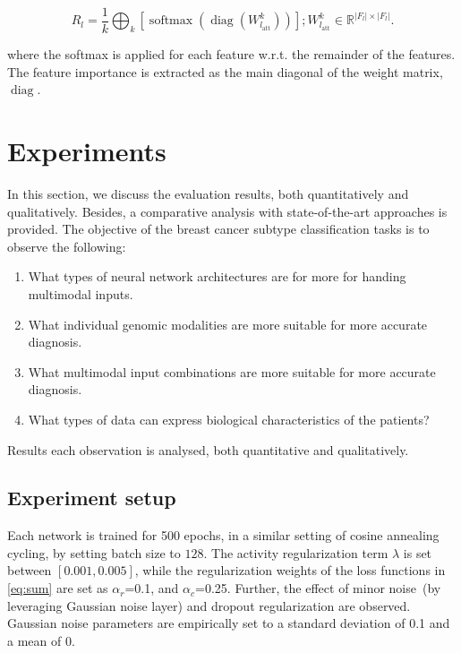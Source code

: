 \begin{equation}
    R_{l}=\frac{1}{k} \bigoplus_{k}\left[\operatorname{softmax}\left(\operatorname{diag}\left(W_{l_{\mathrm{att}}}^{k}\right)\right)\right] ; W_{l_{\mathrm{att}}}^{k} \in \mathbb{R}^{|F_l| \times|F_l|}.
\end{equation}

\hspace*{3.5mm} where the softmax is applied for each feature w.r.t. the remainder of the features. The feature importance is extracted as the main diagonal of the weight matrix, $\operatorname{diag}$. 


\section{Experiments}\label{chapter_5:results} 
In this section, we discuss the evaluation results, both quantitatively and qualitatively. Besides, a comparative analysis with state-of-the-art approaches is provided. The objective of the breast cancer subtype classification tasks is to observe the following:

\begin{enumerate}[noitemsep]
    \item What types of neural network architectures are for more for handing multimodal inputs. 
    \item What individual genomic modalities are more suitable for more accurate diagnosis. 
    \item What multimodal input combinations are more suitable for more accurate diagnosis.
    \item What types of data can express biological characteristics of the patients? 
\end{enumerate}

\hspace*{3.5mm} Results each observation is analysed, both quantitative and qualitatively. 

\subsection{Experiment setup}
Each network is trained for 500 epochs, in a similar setting of cosine annealing cycling, by setting batch size to $128$. The activity regularization term $\lambda$ is set between $[0.001, 0.005]$, while the regularization weights of the loss functions in \cref{eq:sum} are set as  $\alpha_{r}$=0.1, and $\alpha_{c}$=0.25. Further, the effect of minor noise~(by leveraging Gaussian noise layer) and dropout regularization are observed. Gaussian noise parameters are empirically set to a standard deviation of 0.1 and a mean of 0. 

